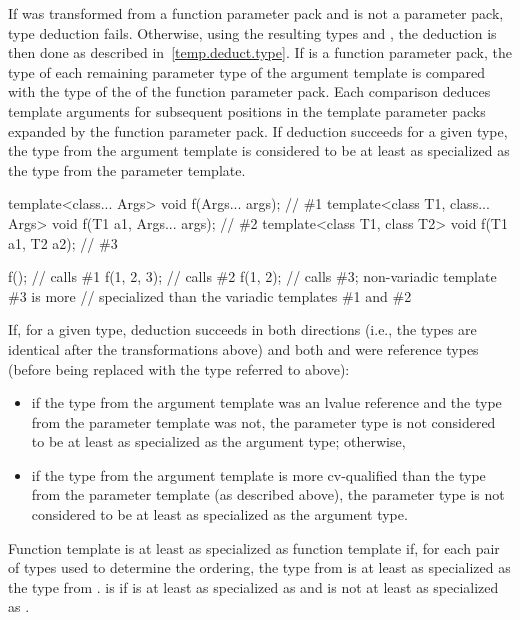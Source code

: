 \pnum
If  was transformed from a function parameter pack and  is not
a parameter pack, type deduction fails. Otherwise, using
the resulting types
and
,
the deduction is then done as described in~\ref{temp.deduct.type}.
If  is a function parameter pack, the type  of each remaining
parameter type of the argument template is compared with the type  of
the  of the function parameter pack. Each comparison
deduces template arguments for subsequent positions in the template parameter
packs expanded by the function parameter pack.
If deduction succeeds for a given type,
the type from the argument template is considered to be at least as specialized
as the type from the parameter template.
\enterexample
\begin{codeblock}
template<class... Args>           void f(Args... args);           // \#1
template<class T1, class... Args> void f(T1 a1, Args... args);    // \#2
template<class T1, class T2>      void f(T1 a1, T2 a2);           // \#3

f();                  // calls \#1
f(1, 2, 3);           // calls \#2
f(1, 2);              // calls \#3; non-variadic template \#3 is more
                      // specialized than the variadic templates \#1 and \#2
\end{codeblock}
\exitexample

\pnum
If, for a given type, deduction succeeds in both directions (i.e., the
types are identical after the transformations above)
and both  and  were reference types (before being replaced with the
type referred to above):

\begin{itemize}
\item if the type from the argument template was an lvalue reference and the type
from the parameter template was not,
the parameter type is not considered to be
at least as specialized as the argument type; otherwise,

\item if the type from
the argument template is more cv-qualified than the type from the
parameter template (as described above),
the parameter type is not considered to be
at least as specialized as the argument type.
\end{itemize}

\pnum
{}%
Function template 
is at least as specialized as
function template  if,
for each pair of types used to determine the ordering,
the type from 
is at least as specialized as
the type from .
is 
 if
is at least as specialized as
 and
is not at least as specialized as
.

